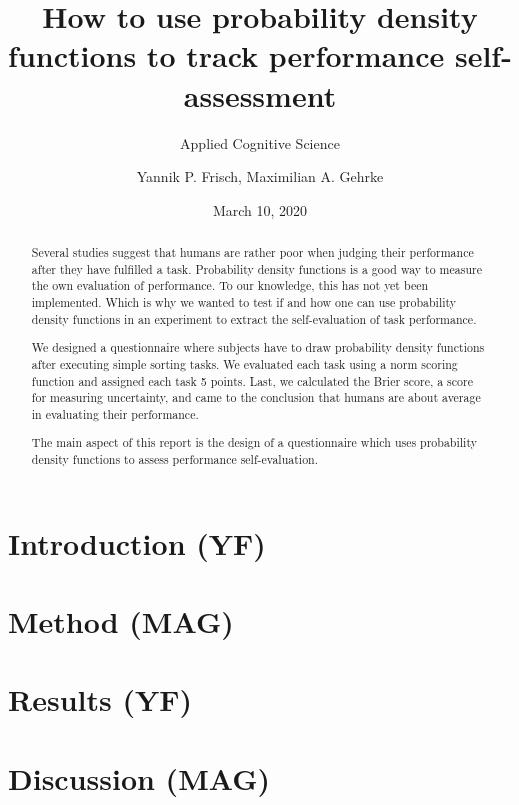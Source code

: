 \documentclass[
pdfa=false,  %
color=9c,
logo=body,
class=article,
marginpar=false,
logofile=../logos/tuda_logo.pdf
]{tudapub}
\author{Yannik P. Frisch, Maximilian A. Gehrke}
\title{How to use probability density functions to track performance self-assessment}
\date{March 10, 2020}
\subtitle{Applied Cognitive Science}
\begin{document}
\maketitle

\begin{abstract}
	Several studies suggest that humans are rather poor when judging their performance after they have fulfilled a task. Probability density functions is a good way to measure the own evaluation of performance. To our knowledge, this has not yet been implemented. Which is why we wanted to test if and how one can use probability density functions in an experiment to extract the self-evaluation of task performance.
	
	We designed a questionnaire where subjects have to draw probability density functions after executing simple sorting tasks. We evaluated each task using a norm scoring function and assigned each task 5 points. Last, we calculated the Brier score, a score for measuring uncertainty, and came to the conclusion that humans are about average in evaluating their performance.
	
	The main aspect of this report is the design of a questionnaire which uses probability density functions to assess performance self-evaluation. 
\end{abstract}

\newpage
\section{Introduction (YF)}
	\label{sec:introduction}
	
	
\newpage
\section{Method (MAG)}
	\label{sec:method}
	
	
\newpage
\section{Results (YF)}
	\label{sec:results}
	
	
\newpage
\section{Discussion (MAG)}
	\label{sec:discussion}
	
\end{document}

